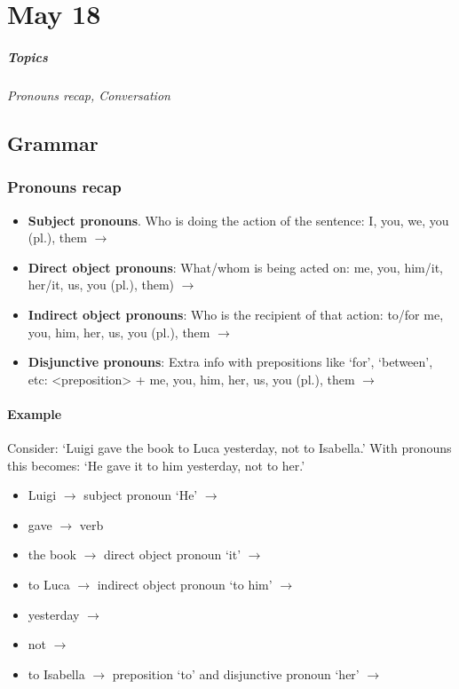 \chapter{May 18}
\paragraph{Topics}
\textit{Pronouns recap, Conversation}

\section{Grammar} \label{0518-Grammar}
\subsection{Pronouns recap}

\begin{itemize}
  \item \textbf{Subject pronouns}. Who is doing the action of the sentence: I, you, we, you (pl.), them $\rightarrow$ 
  \item \textbf{Direct object pronouns}: What/whom is being acted on: me, you, him/it, her/it, us, you (pl.), them) $\rightarrow$ 
  \item \textbf{Indirect object pronouns}: Who is the recipient of that action: to/for me, you, him, her, us, you (pl.), them $\rightarrow$ 
  \item \textbf{Disjunctive pronouns}: Extra info with prepositions like `for', `between', etc: <preposition> + me, you, him, her, us, you (pl.), them $\rightarrow$ 
\end{itemize}

\subsubsection{Example}
Consider: `Luigi gave the book to Luca yesterday, not to Isabella.'
With pronouns this becomes: `He gave it to him yesterday, not to her.'


\begin{itemize}[nosep]
  \item{Luigi $\rightarrow$ subject pronoun `He' $\rightarrow$ }
  \item{gave $\rightarrow$ verb }
  \item{the book $\rightarrow$ direct object pronoun `it' $\rightarrow$ }
  \item{to Luca $\rightarrow$ indirect object pronoun `to him' $\rightarrow$ }
  \item{yesterday $\rightarrow$ }
  \item{not $\rightarrow$ }
  \item{to Isabella $\rightarrow$ preposition `to' and disjunctive pronoun `her' $\rightarrow$ }
\end{itemize}

